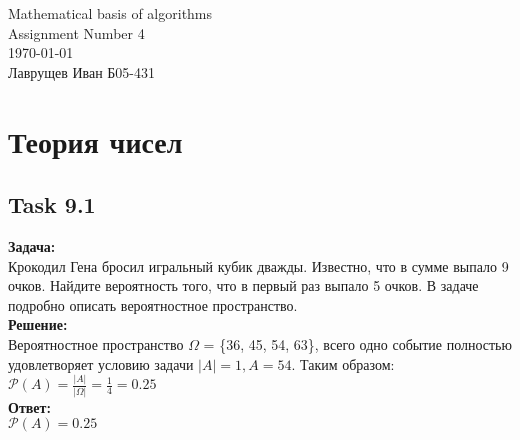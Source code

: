 \documentclass{article}
\begin{document}
\begingroup
    \centering
    \LARGE Mathematical basis of algorithms\\
    \LARGE Assignment Number 4\\[0.5em]
    \large \today \\[0.5em]
    \large Лаврущев Иван Б05-431\par
\endgroup

\tableofcontents

\section{Теория чисел}
\subsection{Task 9.1}
\textbf{Задача:}\\
Крокодил Гена бросил игральный кубик дважды. Известно, что в сумме выпало 9 очков. Найдите вероятность того, что в первый раз выпало 5 очков. В задаче подробно описать вероятностное пространство.\\
\textbf{Решение:}\\
Вероятностное пространство $\Omega$ = \{36, 45, 54, 63\}, всего одно событие полностью удовлетворяет
условию задачи $|A| = 1, A = {54}$. Таким образом: $\mathcal{P}(A) = \frac{|A|}{|\Omega|} = \frac{1}{4} = 0.25$\\
\textbf{Ответ:}\\
$\mathcal{P}(A) = 0.25$
\end{document}
